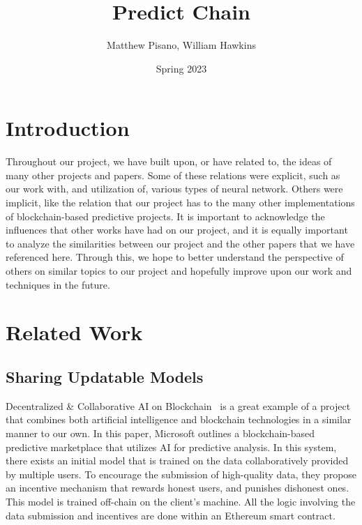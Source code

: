 \documentclass{article}
\title{Predict Chain}
\author{Matthew Pisano, William Hawkins}
\date{Spring 2023}
\begin{document}
    \maketitle

    \section{Introduction}

    Throughout our project, we have built upon, or have related to, the ideas of many other projects and papers.
    Some of these relations were explicit, such as our work with, and utilization of, various types of neural
    network.  Others were implicit, like the relation that our project has to the many other implementations of
    blockchain-based predictive projects.  It is important to acknowledge the influences that other works have
    had on our project, and it is equally important to analyze the similarities between our project and the
    other papers that we have referenced here.  Through this, we hope to better understand the perspective of
    others on similar topics to our project and hopefully improve upon our work and techniques in the future.


    \section{Related Work}

    \subsection{Sharing Updatable Models}

    Decentralized \& Collaborative AI on Blockchain~\cite{sharingModels} is a great example of a project that combines
    both artificial intelligence and blockchain technologies in a similar manner to our own.  In this paper, Microsoft
    outlines a blockchain-based predictive marketplace that utilizes AI for predictive analysis.  In this system, there
    exists an initial model that is trained on the data collaboratively provided by multiple users.  To encourage
    the submission of high-quality data, they propose an incentive mechanism that rewards honest users, and punishes
    dishonest ones.  This model is trained off-chain on the client's machine.  All the logic involving the
    data submission and incentives are done within an Ethereum smart contract.
\end{document}
